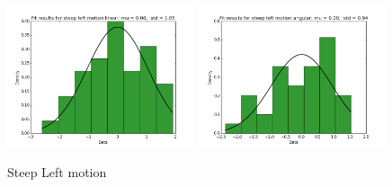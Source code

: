 \documentclass[10pt]{scrartcl}
\begin{document}
\begin{figure}[H]
\centering
\caption{Steep Left motion}
\label{fig:15}
\includegraphics[width=0.49\textwidth ]{images/pca_steep_left_linear_data}
\includegraphics[width=0.49\textwidth]{images/pca_steep_left_angular_data}
\end{figure}
\end{document}
